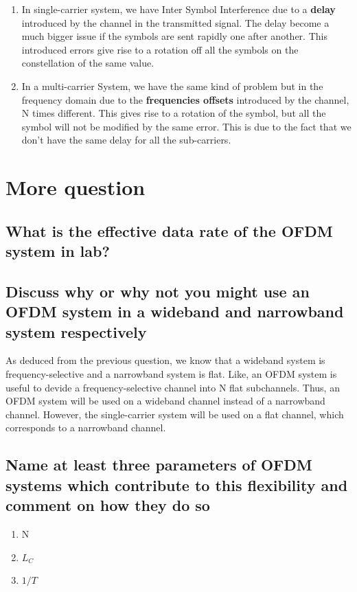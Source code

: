 \documentclass[frenchb, oneside, headings=normal]{scrartcl}
\begin{document}
\begin{enumerate}
\item In single-carrier system, we have Inter Symbol Interference due to a \textbf{delay} introduced by the channel in the transmitted signal. The delay become a much bigger issue if the symbols are sent rapidly one after another. This introduced errors give rise to a rotation off all the symbols on the constellation of the same value.

\item In a multi-carrier System, we have the same kind of problem but in the frequency domain due to the \textbf{frequencies offsets} introduced by the channel, N times different. This gives rise to a rotation of the symbol, but all the symbol will not be modified by the same error. This is due to the fact that we don't have the same delay for all the sub-carriers.

\end{enumerate}

\section{More question}

\subsection{What is the effective data rate of the OFDM system in lab?}

\subsection{Discuss why or why not you might use an OFDM system in a wideband and narrowband system respectively}

As deduced from the previous question, we know that a wideband system is frequency-selective and a narrowband system is flat. Like, an OFDM system is useful to devide a frequency-selective channel into N flat subchannels. Thus, an OFDM system will be used on a wideband channel instead of a narrowband channel.
However, the single-carrier system will be used on a flat channel, which corresponds to a narrowband channel.

\subsection{Name at least three parameters of OFDM systems which contribute to this flexibility and comment on how they do so}

\begin{enumerate}

\item N
\item $L_C$
\item $1/T$


\end{enumerate}
\end{document}
